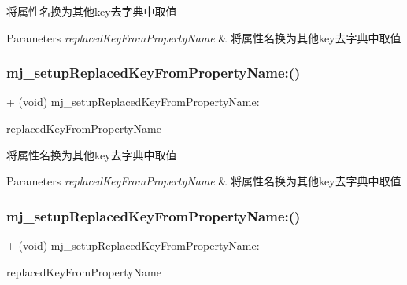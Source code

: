 将属性名换为其他key去字典中取值


\begin{DoxyParams}{Parameters}
{\em replaced\+Key\+From\+Property\+Name} & 将属性名换为其他key去字典中取值 \\
\hline
\end{DoxyParams}
\mbox{\label{category_n_s_object_07_m_j_property_08_a1883e0f76733827afe0a1855d8bfb6f8}} 
\subsubsection{\texorpdfstring{mj\+\_\+setup\+Replaced\+Key\+From\+Property\+Name\+:()}{mj\_setupReplacedKeyFromPropertyName:()}\hspace{0.1cm}{\footnotesize\ttfamily [2/3]}}
{\footnotesize\ttfamily + (void) mj\+\_\+setup\+Replaced\+Key\+From\+Property\+Name\+: \begin{DoxyParamCaption}\item[{(M\+J\+Replaced\+Key\+From\+Property\+Name)}]{replaced\+Key\+From\+Property\+Name }\end{DoxyParamCaption}}

将属性名换为其他key去字典中取值


\begin{DoxyParams}{Parameters}
{\em replaced\+Key\+From\+Property\+Name} & 将属性名换为其他key去字典中取值 \\
\hline
\end{DoxyParams}
\mbox{\label{category_n_s_object_07_m_j_property_08_a1883e0f76733827afe0a1855d8bfb6f8}} 
\subsubsection{\texorpdfstring{mj\+\_\+setup\+Replaced\+Key\+From\+Property\+Name\+:()}{mj\_setupReplacedKeyFromPropertyName:()}\hspace{0.1cm}{\footnotesize\ttfamily [3/3]}}
{\footnotesize\ttfamily + (void) mj\+\_\+setup\+Replaced\+Key\+From\+Property\+Name\+: \begin{DoxyParamCaption}\item[{(M\+J\+Replaced\+Key\+From\+Property\+Name)}]{replaced\+Key\+From\+Property\+Name }\end{DoxyParamCaption}}

